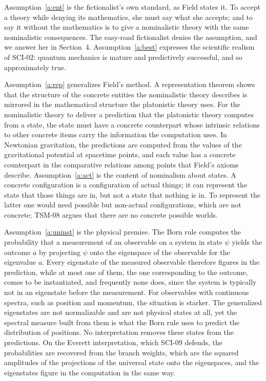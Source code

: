 \documentclass{situationist-preprint}
\begin{document}
Assumption~\ref{a:ent} is the fictionalist's own standard, as Field states it. To accept a theory while denying its mathematics, she must say what she accepts; and to say it without the mathematics is to give a nominalistic theory with the same nominalistic consequences. The easy-road fictionalist denies the assumption, and we answer her in Section~4. Assumption~\ref{a:best} expresses the scientific realism of SCI-02: quantum mechanics is mature and predictively successful, and so approximately true.

Assumption~\ref{a:rep} generalizes Field's method. A representation theorem shows that the structure of the concrete entities the nominalistic theory describes is mirrored in the mathematical structure the platonistic theory uses. For the nominalistic theory to deliver a prediction that the platonistic theory computes from a state, the state must have a concrete counterpart whose intrinsic relations to other concrete items carry the information the computation uses. In Newtonian gravitation, the predictions are computed from the values of the gravitational potential at spacetime points, and each value has a concrete counterpart in the comparative relations among points that Field's axioms describe. Assumption~\ref{a:act} is the content of nominalism about states. A concrete configuration is a configuration of actual things; it can represent the state that those things are in, but not a state that nothing is in. To represent the latter one would need possible but non-actual configurations, which are not concrete; TSM-08 argues that there are no concrete possible worlds.

Assumption~\ref{a:uninst} is the physical premise. The Born rule computes the probability that a measurement of an observable on a system in state $\psi$ yields the outcome $a$ by projecting $\psi$ onto the eigenspace of the observable for the eigenvalue $a$. Every eigenstate of the measured observable therefore figures in the prediction, while at most one of them, the one corresponding to the outcome, comes to be instantiated, and frequently none does, since the system is typically not in an eigenstate before the measurement. For observables with continuous spectra, such as position and momentum, the situation is starker. The generalized eigenstates are not normalizable and are not physical states at all, yet the spectral measure built from them is what the Born rule uses to predict the distribution of positions. No interpretation removes these states from the predictions. On the Everett interpretation, which SCI-09 defends, the probabilities are recovered from the branch weights, which are the squared amplitudes of the projections of the universal state onto the eigenspaces, and the eigenstates figure in the computation in the same way.
\end{document}

